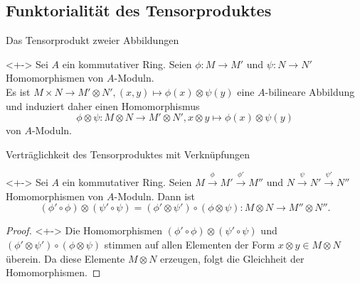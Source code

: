\subsection{Funktorialität des Tensorproduktes}

\begin{frame}{Das Tensorprodukt zweier Abbildungen}
	\begin{example}<+->
		Sei \(A\) ein kommutativer Ring. Seien \(\phi\colon M \to M'\) und \(\psi\colon N \to N'\)
		Homomorphismen von \(A\)-Moduln.
		\\
		Es ist \(M \times N \to M' \otimes N', (x, y) \mapsto \phi(x) \otimes \psi(y)\) eine \(A\)-bilineare
		Abbildung und induziert daher einen Homomorphismus
		\[
			\phi \otimes \psi\colon M \otimes N \to M' \otimes N', x \otimes y \mapsto \phi(x) \otimes \psi(y)
		\]
		von \(A\)-Moduln.
	\end{example}
\end{frame}

\begin{frame}{Verträglichkeit des Tensorproduktes mit Verknüpfungen}
	\begin{proposition}<+->
		Sei \(A\) ein kommutativer Ring. Seien \(M \xrightarrow\phi M' \xrightarrow{\phi'} M''\) und
		\(N \xrightarrow{\psi} N' \xrightarrow{\psi'} N''\) Homomorphismen von \(A\)-Moduln. Dann ist
		\[
			(\phi' \circ \phi) \otimes (\psi' \circ \psi) = (\phi' \otimes \psi') \circ
			(\phi \otimes \psi)\colon M \otimes N \to M'' \otimes N''.
		\]
	\end{proposition}
	\begin{proof}<+->
		Die Homomorphismen \((\phi' \circ \phi) \otimes (\psi' \circ \psi)\) und \((\phi' \otimes \psi')
		\circ (\phi \otimes \psi)\) stimmen auf allen Elementen der Form \(x \otimes y \in M \otimes N\)
		überein. Da diese Elemente \(M \otimes N\) erzeugen, folgt die Gleichheit der Homomorphismen.
	\end{proof}
\end{frame}

